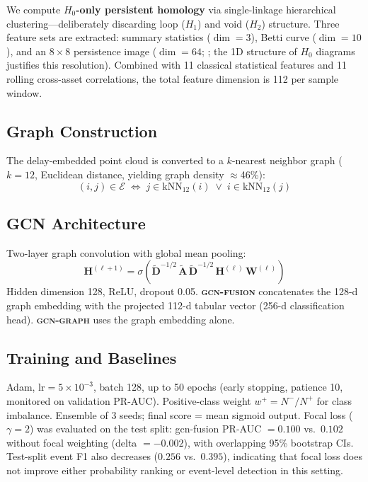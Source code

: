 \documentclass[sigconf]{acmart}
\begin{document}
We compute \textbf{$H_0$-only persistent homology} via single-linkage
hierarchical clustering---deliberately discarding loop ($H_1$) and void ($H_2$)
structure. Three feature sets are extracted: summary statistics ($\dim=3$),
Betti curve ($\dim=10$), and an $8{\times}8$ persistence image ($\dim=64$;
\citealt{adams2017}; the 1D structure of $H_0$ diagrams justifies this
resolution). Combined with 11 classical statistical features and 11 rolling
cross-asset correlations, the total feature dimension is 112 per sample window.

\subsection{Graph Construction}

The delay-embedded point cloud is converted to a $k$-nearest neighbor graph
($k{=}12$, Euclidean distance, yielding graph density $\approx$46\%):
%
\begin{equation}
(i, j) \in \mathcal{E} \;\Leftrightarrow\;
j \in \mathrm{kNN}_{12}(i) \;\vee\; i \in \mathrm{kNN}_{12}(j)
\label{eq:knn}
\end{equation}

\subsection{GCN Architecture}

Two-layer graph convolution \cite{kipf2017} with global mean pooling:
%
\begin{equation}
\mathbf{H}^{(\ell+1)} = \sigma\!\left(
  \tilde{\mathbf{D}}^{-1/2}\,\tilde{\mathbf{A}}\,\tilde{\mathbf{D}}^{-1/2}\,
  \mathbf{H}^{(\ell)}\,\mathbf{W}^{(\ell)}
\right)
\label{eq:gcn}
\end{equation}
%
Hidden dimension 128, ReLU, dropout 0.05. \textbf{\textsc{gcn-fusion}}
concatenates the 128-d graph embedding with the projected 112-d tabular
vector (256-d classification head). \textbf{\textsc{gcn-graph}} uses the
graph embedding alone.

\subsection{Training and Baselines}

Adam, lr$=5\!\times\!10^{-3}$, batch 128, up to 50 epochs (early stopping,
patience 10, monitored on validation PR-AUC). Positive-class weight $w^+{=}N^-/N^+$
for class imbalance. Ensemble of 3 seeds; final score = mean sigmoid output.
Focal loss \cite{lin2017focal} ($\gamma{=}2$) was evaluated on the test split:
gcn-fusion PR-AUC $= 0.100$ vs.\ $0.102$ without focal weighting (delta $= {-}0.002$),
with overlapping 95\% bootstrap CIs. Test-split event F1 also decreases
($0.256$ vs.\ $0.395$), indicating that focal loss does not improve either
probability ranking or event-level detection in this setting.
\end{document}
